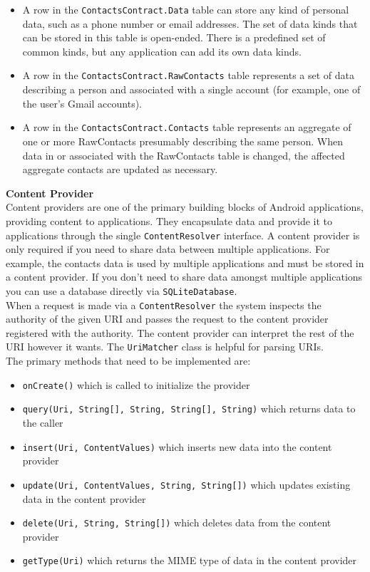 \begin{itemize}
 \item A row in the \texttt{ContactsContract.Data} table can store any kind of personal data, such as a phone number or email addresses. 
The set of data kinds that can be stored in this table is open-ended. There is a predefined set of common kinds, but any application 
can add its own data kinds.
 \item A row in the \texttt{ContactsContract.RawContacts} table represents a set of data describing a person and associated with a 
single account (for example, one of the user's Gmail accounts).
 \item A row in the \texttt{ContactsContract.Contacts} table represents an aggregate of one or more RawContacts presumably describing 
the same person. When data in or associated with the RawContacts table is changed, the affected aggregate contacts are updated as necessary. 
\end{itemize}
\vspace{1cm}
\textbf{Content Provider}\\
\hspace*{0.82cm}Content providers are one of the primary building blocks of Android applications, providing content to applications. 
They encapsulate data and provide it to applications through the single \texttt{ContentResolver} interface. A content provider is only 
required if you need to share data between multiple applications. For example, the contacts data is used by multiple applications and 
must be stored in a content provider. If you don't need to share data amongst multiple applications you can use a database directly via 
\texttt{SQLiteDatabase}.\\[0.5cm]
\hspace*{0.82cm}When a request is made via a \texttt{ContentResolver} the system inspects the authority of the given URI and passes the 
request to the content provider registered with the authority. The content provider can interpret the rest of the URI however it wants. 
The \texttt{UriMatcher} class is helpful for parsing URIs.\\[0.5cm]
The primary methods that need to be implemented are:
\begin{itemize}
 \item \texttt{onCreate()} which is called to initialize the provider
 \item \texttt{query(Uri, String[], String, String[], String)} which returns data to the caller
 \item \texttt{insert(Uri, ContentValues)} which inserts new data into the content provider
 \item \texttt{update(Uri, ContentValues, String, String[])} which updates existing data in the content provider
 \item \texttt{delete(Uri, String, String[])} which deletes data from the content provider
 \item \texttt{getType(Uri)} which returns the MIME type of data in the content provider
\end{itemize}
